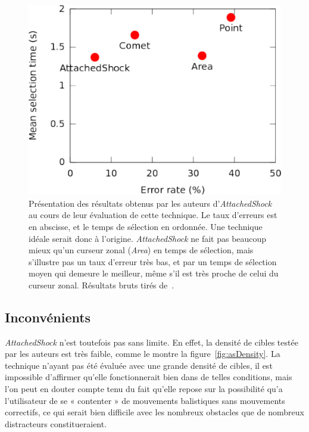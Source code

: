 	\begin{figure}[H]
		\centering
		\includegraphics[width=\textwidth]{figures/ch2/asRes}
		\caption[\emph{AttachedShock}, performance]{Présentation des résultats obtenus par les auteurs d'\emph{AttachedShock} au cours de leur évaluation de cette technique. Le taux d'erreurs est en abscisse, et le temps de sélection en ordonnée. Une technique idéale serait donc à l'origine. \emph{AttachedShock} ne fait pas beaucoup mieux qu'un curseur zonal (\emph{Area}) en temps de sélection, mais s'illustre pas un taux d'erreur très bas, et par un temps de sélection moyen qui demeure le meilleur, même s'il est très proche de celui du curseur zonal. Résultats bruts tirés de~\cite{you2012attachedshock}.}
		\label{fig:asRes}
	\end{figure}

	\subsection{Inconvénients}
	\emph{AttachedShock} n'est toutefois pas sans limite. En effet, la densité de cibles testée par les auteurs est très faible, comme le montre la figure~\ref{fig:asDensity}. La technique n'ayant pas été évaluée avec une grande densité de cibles, il est impossible d'affirmer qu'elle fonctionnerait bien dans de telles conditions, mais l'on peut en douter compte tenu du fait qu'elle repose sur la possibilité qu'a l'utilisateur de se « contenter » de mouvements balistiques sans mouvements correctifs, ce qui serait bien difficile avec les nombreux obstacles que de nombreux distracteurs constitueraient.
	
